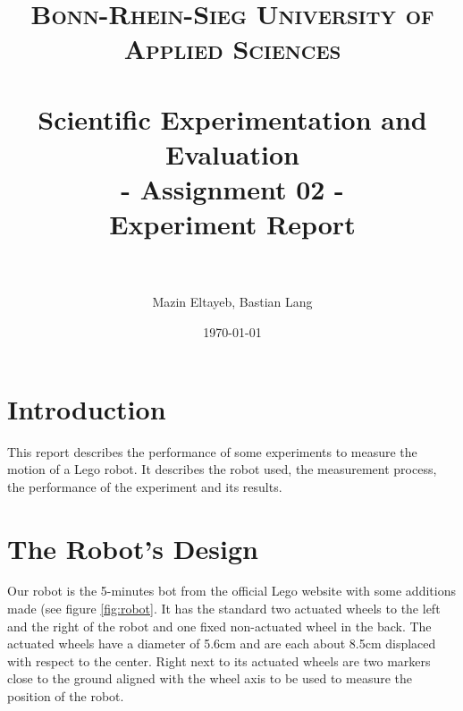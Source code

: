 \documentclass[paper=a4, fontsize=11pt]{scrartcl} %
\title{	
\normalfont \normalsize 
\textsc{Bonn-Rhein-Sieg University of Applied Sciences} \\ [25pt] %
\horrule{0.5pt} \\[0.4cm] %
\huge Scientific Experimentation and Evaluation\\
- Assignment 02 - \\ 
Experiment Report \\%
\horrule{2pt} \\[0.5cm] %
}
\author{Mazin Eltayeb, Bastian Lang} %
\date{\normalsize\today} %
\numberwithin{equation}{section} %
\numberwithin{figure}{section} %
\numberwithin{table}{section} %
\begin{document}
\maketitle %

\tableofcontents
\newpage

\section{Introduction}
This report describes the performance of some experiments to measure the motion of a Lego robot.
It describes the robot used, the measurement process, the performance of the experiment and its results.



\section{The Robot's Design}
Our robot is the 5-minutes bot from the official Lego website with some additions made (see figure \ref{fig:robot}. 
It has the standard two actuated wheels to the left and the right of the robot and one fixed non-actuated wheel in the back. 
The actuated wheels have a diameter of 5.6cm and are each about 8.5cm displaced with respect to the center. 
Right next to its actuated wheels are two markers close to the ground aligned with the wheel axis to be used to measure the position of the robot.
\end{document}
